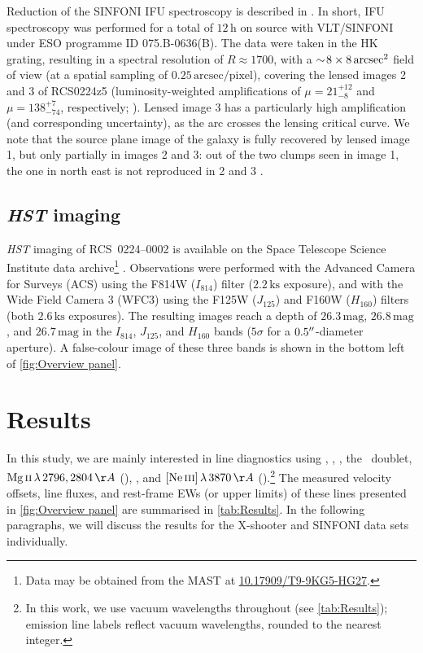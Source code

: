 Reduction of the SINFONI IFU spectroscopy is described in \citet{2007MNRAS.376..479S}. In short, IFU spectroscopy was performed for a total of $12 \, \mathrm{h}$ on source with VLT/SINFONI \citep{2003SPIE.4841.1548E, 2004Msngr.117...17B} under ESO programme ID 075.B-0636(B). The data were taken in the HK grating, resulting in a spectral resolution of $R \approx 1700$, with a $\sim \! 8 \times 8 \, \mathrm{arcsec^2}$ field of view (at a spatial sampling of $0.25 \, \mathrm{arcsec/pixel}$), covering the lensed images 2 and 3 of RCS0224z5 (luminosity-weighted amplifications of $\mu = 21_{-8}^{+12}$ and $\mu = 138_{-74}^{+7}$, respectively; \citealt{2017MNRAS.467.3306S}). Lensed image 3 has a particularly high amplification (and corresponding uncertainty), as the arc crosses the lensing critical curve. We note that the source plane image of the galaxy is fully recovered by lensed image 1, but only partially in images 2 and 3: out of the two clumps seen in image 1, the one in north east is not reproduced in 2 and 3 \citep[see][ for details]{2017MNRAS.467.3306S}.

\subsection{\textit{HST} imaging}
\label{ssec:Observations: HST}

\textit{HST} imaging of RCS~0224--0002 is available on the Space Telescope Science Institute data archive\footnote{Data may be obtained from the MAST at \href{https://dx.doi.org/10.17909/t9-9kg5-hg27}{10.17909/T9-9KG5-HG27}.} \citep[GO 14497, PI: Smit; see][]{2017MNRAS.467.3306S}. Observations were performed with the Advanced Camera for Surveys (ACS) using the F814W ($I_{814}$) filter ($2.2 \, \mathrm{ks}$ exposure), and with the Wide Field Camera 3 (WFC3) using the F125W ($J_{125}$) and F160W ($H_{160}$) filters (both $2.6 \, \mathrm{ks}$ exposures). The resulting images reach a depth of $26.3 \, \mathrm{mag}$, $26.8 \, \mathrm{mag}$, and $26.7 \, \mathrm{mag}$ in the $I_{814}$, $J_{125}$, and $H_{160}$ bands ($5\sigma$ for a $0.5 \hbox{$^{\prime\prime}$}$-diameter aperture). A false-colour image of these three bands is shown in the bottom left of \cref{fig:Overview panel}.

\section{Results}
\label{ch2sec:Results}

In this study, we are mainly interested in line diagnostics using \lya, \CIV, \HeII, the \CIII\ doublet, $\MgII \, \lambda \, 2796, 2804 \, \Angstrom$ (\MgII), \OII, and $\NeIII \, \lambda \, 3870 \, \Angstrom$ (\NeIII).\footnote{In this work, we use vacuum wavelengths throughout (see \cref{tab:Results}); emission line labels reflect vacuum wavelengths, rounded to the nearest integer.} The measured velocity offsets, line fluxes, and rest-frame EWs (or upper limits) of these lines presented in \cref{fig:Overview panel} are summarised in \cref{tab:Results}. In the following paragraphs, we will discuss the results for the X-shooter and SINFONI data sets individually.

